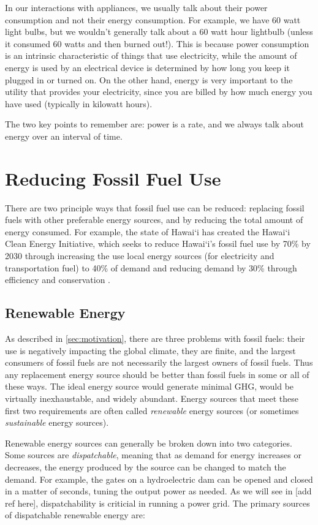 In our interactions with appliances, we usually talk about their power consumption and not their energy consumption. For example, we have 60 watt light bulbs, but we wouldn't generally talk about a 60 watt hour lightbulb (unless it consumed 60 watts and then burned out!). This is because power consumption is an intrinsic characteristic of things that use electricity, while the amount of energy is used by an electrical device is determined by how long you keep it plugged in or turned on. On the other hand, energy is very important to the utility that provides your electricity, since you are billed by how much energy you have used (typically in kilowatt hours).

The two key points to remember are: power is a rate, and we always talk about energy over an interval of time.

\section{Reducing Fossil Fuel Use}

There are two principle ways that fossil fuel use can be reduced: replacing fossil fuels with other preferable energy sources, and by reducing the total amount of energy consumed. For example, the state of Hawai`i has created the Hawai`i Clean Energy Initiative, which seeks to reduce Hawai`i's fossil fuel use by 70\% by 2030 through increasing the use local energy sources (for electricity and transportation fuel) to 40\% of demand and reducing demand by 30\% through efficiency and conservation \cite{HCEI-website}.

\subsection{Renewable Energy}

As described in \autoref{sec:motivation}, there are three problems with fossil fuels: their use is negatively impacting the global climate, they are finite, and the largest consumers of fossil fuels are not necessarily the largest owners of fossil fuels. Thus any replacement energy source should be better than fossil fuels in some or all of these ways. The ideal energy source would generate minimal GHG, would be virtually inexhaustable, and widely abundant. Energy sources that meet these first two requirements are often called \emph{renewable} energy sources (or sometimes \emph{sustainable} energy sources).

Renewable energy sources can generally be broken down into two categories. Some sources are \emph{dispatchable}, meaning that as demand for energy increases or decreases, the energy produced by the source can be changed to match the demand. For example, the gates on a hydroelectric dam can be opened and closed in a matter of seconds, tuning the output power as needed. As we will see in [add ref here], dispatchability is criticial in running a power grid. The primary sources of dispatchable renewable energy are:

